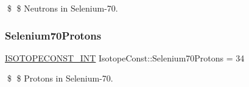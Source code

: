 \$ \$ Neutrons in Selenium-\/70. \mbox{\label{group___isotope_const-_selenium-_se70_ga460bb7495c09188d522c60ce8a02d76c}} 
\subsubsection{\texorpdfstring{Selenium70\+Protons}{Selenium70Protons}}
{\footnotesize\ttfamily \mbox{\hyperlink{group___isotope_const-_macros_ga5f18360b3e99483a35c32d789e62621c}{I\+S\+O\+T\+O\+P\+E\+C\+O\+N\+S\+T\+\_\+\+I\+NT}} Isotope\+Const\+::\+Selenium70\+Protons = 34}

\$ \$ Protons in Selenium-\/70. 